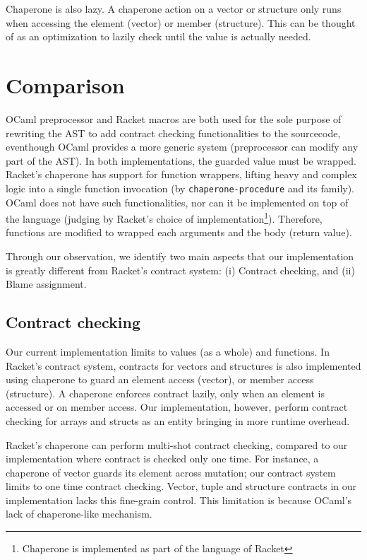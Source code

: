 Chaperone is also lazy. A chaperone action on a vector or structure only runs when accessing the element (vector) or member (structure). This can be thought of as an optimization to lazily check until the value is actually needed.

\section{Comparison}

OCaml preprocessor and Racket macros are both used for the sole purpose of rewriting the AST to add contract checking functionalities to the sourcecode, eventhough OCaml provides a more generic system (preprocessor can modify any part of the AST). In both implementations, the guarded value must be wrapped. Racket's chaperone has support for function wrappers, lifting heavy and complex logic into a single function invocation (by \texttt{chaperone-procedure} and its family). OCaml does not have such functionalities, nor can it be implemented on top of the language (judging by Racket's choice of implementation\footnote{Chaperone is implemented as part of the language of Racket}). Therefore, functions are modified to wrapped each arguments and the body (return value).

Through our observation, we identify two main aspects that our implementation is greatly different from Racket's contract system: (i) Contract checking, and (ii) Blame assignment.

\subsection{Contract checking}

Our current implementation limits to values (as a whole) and functions. In Racket's contract system, contracts for vectors and structures is also implemented using chaperone to guard an element access (vector), or member access (structure). A chaperone enforces contract lazily, only when an element is accessed or on member access. Our implementation, however, perform contract checking for arrays and structs as an entity bringing in more runtime overhead.

Racket's chaperone can perform multi-shot contract checking, compared to our implementation where contract is checked only one time. For instance, a chaperone of vector guards its element across mutation; our contract system limits to one time contract checking. Vector, tuple and structure contracts in our implementation lacks this fine-grain control. This limitation is because OCaml's lack of chaperone-like mechanism.


